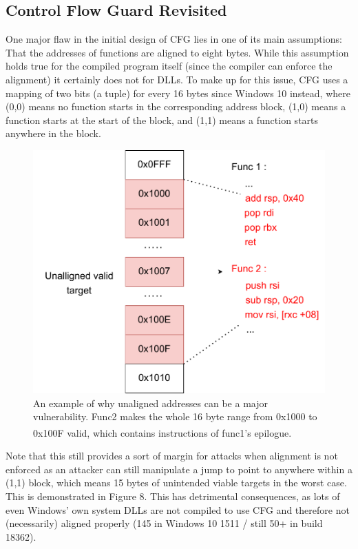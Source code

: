 \documentclass[10pt,twocolumn,a4paper]{article}
\begin{document}
\subsection{Control Flow Guard Revisited}
One major flaw in the initial design of CFG lies in one of its main assumptions: That the addresses of functions are aligned to eight bytes.
While this assumption holds true for the compiled program itself (since the compiler can enforce the alignment) it certainly does not for DLLs.
To make up for this issue, CFG uses a mapping of two bits (a tuple) for every 16 bytes since Windows 10 instead, where (0,0) means no function starts in the corresponding address block, (1,0) means a function starts at the start of the block, and (1,1) means a function starts anywhere in the block\cite{tuple}.
\begin{figure}[h]
	\includegraphics[keepaspectratio,width=\linewidth]{fig/unallignedcode}
	\caption{An example of why unaligned addresses can be a major vulnerability. Func2 makes the whole 16 byte range from 0x1000 to 0x100F valid, which contains instructions of func1's epilogue\textsuperscript{\cite{cfgexplore}}.}
\end{figure}\newline
Note that this still provides a sort of margin for attacks when alignment is not enforced as an attacker can still manipulate a jump to point to anywhere within a (1,1) block, which means 15 bytes of unintended viable targets in the worst case.
This is demonstrated in Figure 8.
This has detrimental consequences, as lots of even Windows' own system DLLs are not compiled to use CFG and therefore not (necessarily) aligned properly (145 in Windows 10 1511 / still 50+ in build 18362\cite{cfgbypass2}).
\end{document}
